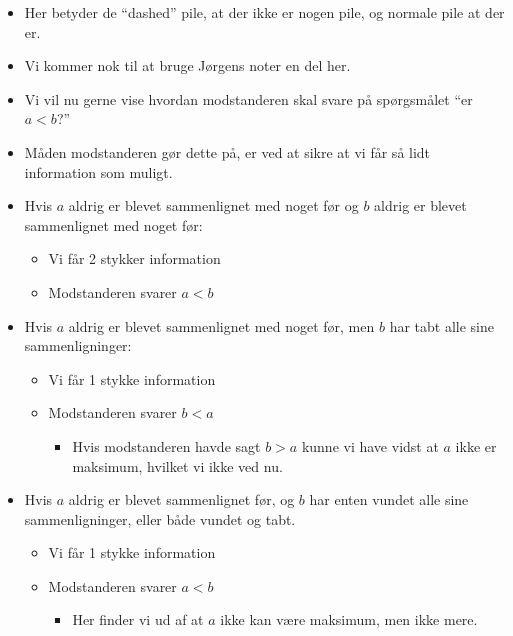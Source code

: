 \begin{frame}[allowframebreaks]
\begin{center}
 \end{center}
 \begin{itemize}
   \item Her betyder de ``dashed'' pile, at der ikke er nogen pile, og normale pile at der er.
   \item Vi kommer nok til at bruge Jørgens noter en del her.
   \item Vi vil nu gerne vise hvordan modstanderen skal svare på spørgsmålet ``er $a < b$?''
   \item Måden modstanderen gør dette på, er ved at sikre at vi får så lidt information som muligt.
   \item Hvis $a$ aldrig er blevet sammenlignet med noget før og $b$ aldrig er blevet sammenlignet med noget før:
         \begin{itemize}
           \item Vi får 2 stykker information
           \item Modstanderen svarer $a < b$
         \end{itemize}
   \item Hvis $a$ aldrig er blevet sammenlignet med noget før, men $b$ har tabt alle sine sammenligninger:
         \begin{itemize}
           \item Vi får 1 stykke information
           \item Modstanderen svarer $b < a$
                 \begin{itemize}
                   \item Hvis modstanderen havde sagt $b > a$ kunne vi have vidst at $a$ ikke er maksimum, hvilket vi ikke ved nu.
                 \end{itemize}
         \end{itemize}

   \item Hvis $a$ aldrig er blevet sammenlignet før, og $b$ har enten vundet alle sine sammenligninger, eller både vundet og tabt.
         \begin{itemize}
           \item Vi får 1 stykke information
           \item Modstanderen svarer $a < b$
                 \begin{itemize}
                   \item Her finder vi ud af at $a$ ikke kan være maksimum, men ikke mere.
                 \end{itemize}
         \end{itemize}


\end{itemize}
\end{frame}
